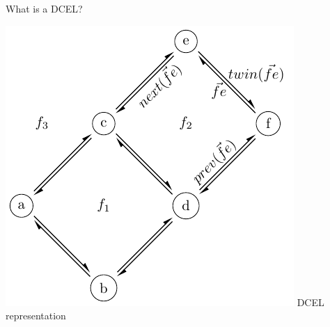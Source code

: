 \begin{frame}{What is a DCEL?}
\begin{minipage}{0.34\textwidth}
            \includegraphics[width=\textwidth]{figures/dcel_representation1}
            \tiny{DCEL representation}
        \end{minipage}
    \end{frame}

